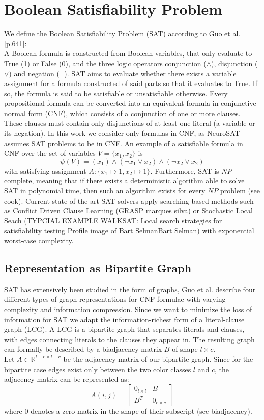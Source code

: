 \section{Boolean Satisfiability Problem}
We define the Boolean Satisfiability Problem (SAT) according to Guo et al.\cite{guo2023machine}[p.641]: \\
A Boolean formula is constructed from Boolean variables, that only evaluate to True (1) or False (0), and the three logic operators conjunction ($\wedge$), disjunction ($\vee$) and negation ($\neg$). SAT aims to evaluate whether there exists a variable assignment for a formula constructed of said parts so that it evaluates to True. If so, the formula is said to be satisfiable or unsatisfiable otherwise. Every propositional formula can be converted into an equivalent formula in conjunctive normal form (CNF), which consists of a conjunction of one or more clauses. These clauses must contain only disjunctions of at least one literal (a variable or its negation). In this work we consider only formulas in CNF, as NeuroSAT\cite{} assumes SAT problems to be in CNF. An example of a satisfiable formula in CNF over the set of variables $V=\{x_1,x_2\}$ is 
$$\psi(V) = (x_1) \land (\neg x_1 \lor x_2) \land (\neg x_2 \lor x_2)$$
with satisfying assignment $A:\{x_1 \mapsto 1, x_2 \mapsto 1\}$. Furthermore, SAT is $NP$-complete, meaning that if there exists a deterministic algorithm able to solve SAT in polynomial time, then such an algorithm exists for every $NP$ problem (see cook\cite{}). Current state of the art SAT solvers apply searching based methods such as Conflict Driven Clause Learning (GRASP marques silva)\cite{} or Stochastic Local Seach (TYPCIAL EXAMPLE WALKSAT: Local search strategies for satisfiability testing Profile image of Bart SelmanBart Selman)\cite{} with exponential worst-case complexity.

\subsection{Representation as Bipartite Graph}
SAT has extensively been studied in the form of graphs,
Guo et al. describe four different types of graph representations for CNF formulae with varying complexity and information compression. Since we want to minimize the loss of information for SAT we adapt the information-richest form of a literal-clause graph (LCG). 
A LCG is a bipartite graph that separates literals and clauses, with edges connecting literals to the clauses they appear in.
The resulting graph can formally be described by a biadjacency matrix $B$ of shape $l \times c$. \\
Let $A \in \mathbb{R}^{l+c \times l+c}$ be the adjacency matrix of our bipartite graph. Since for the bipartite case edges exist only between the two color classes $l$ and $c$, the adjacency matrix can be represented as:
\begin{equation}
    A(i,j) = \begin{bmatrix}
        0_{l \times l} & B \\
        B^T & 0_{c \times c}
    \end{bmatrix}
\end{equation}
where $0$ denotes a zero matrix in the shape of their subscript (see biadjacency\cite{}).

